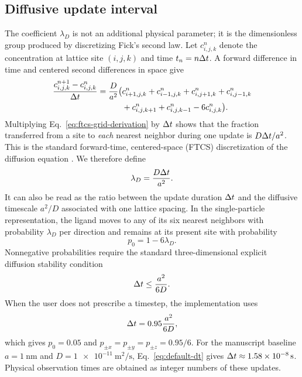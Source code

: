 \subsection{Diffusive update interval}

The coefficient $\lambda_D$ is not an additional physical parameter; it is
the dimensionless group produced by discretizing Fick's second law.  Let
$c_{i,j,k}^{n}$ denote the concentration at lattice site $(i,j,k)$ and time
$t_n=n\Delta t$.  A forward difference in time and centered second differences in
space give
\begin{align}
 \frac{c_{i,j,k}^{n+1}-c_{i,j,k}^{n}}{\Delta t}
 =\frac{D}{a^2}\big(&c_{i+1,j,k}^{n}+c_{i-1,j,k}^{n}
 +c_{i,j+1,k}^{n}+c_{i,j-1,k}^{n}\nonumber\\
 &+c_{i,j,k+1}^{n}+c_{i,j,k-1}^{n}
 -6c_{i,j,k}^{n}\big).
 \label{eq:ftcs-grid-derivation}
\end{align}
Multiplying Eq.~\ref{eq:ftcs-grid-derivation} by $\Delta t$ shows that the fraction
transferred from a site to \emph{each} nearest neighbor during one update is
$D\Delta t/a^2$.  This is the standard forward-time, centered-space (FTCS)
discretization of the diffusion equation \citep{crank1975}.  We therefore
define
\begin{equation}
 \lambda_D=\frac{D\Delta t}{a^2}.
 \label{eq:lambda-D}
\end{equation}
It can also be read as the ratio between the update duration $\Delta t$ and the
diffusive timescale $a^2/D$ associated with one lattice spacing.  In the
single-particle representation, the ligand moves to any of its six nearest
neighbors with probability $\lambda_D$ per direction and remains at its
present site with probability
\begin{equation}
 p_0=1-6\lambda_D.
 \label{eq:stay-probability}
\end{equation}
Nonnegative probabilities require the standard three-dimensional explicit
diffusion stability condition
\begin{equation}
 \Delta t\leq \frac{a^2}{6D}.
 \label{eq:stability}
\end{equation}
When the user does not prescribe a timestep, the implementation uses
\begin{equation}
 \Delta t=0.95\frac{a^2}{6D},
 \label{eq:default-dt}
\end{equation}
which gives $p_0=0.05$ and $p_{\pm x}=p_{\pm y}=p_{\pm z}=0.95/6$.  For the
manuscript baseline $a=\SI{1}{\nano\meter}$ and
$D=\SI{1e-11}{\meter\squared\per\second}$,
Eq.~\ref{eq:default-dt} gives $\Delta t\approx\SI{1.58e-8}{\second}$.  Physical
observation times are obtained as integer numbers of these updates.

